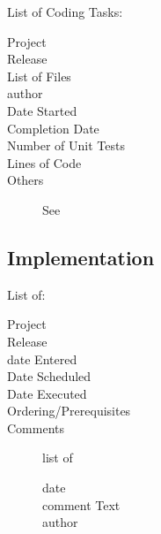 \documentclass[SDSUThesis.tex]{subfiles}
\begin{document}
    List of Coding Tasks:
    \begin{description}
      \item[Project] 
      \item[Release]
      \item[List of Files]
      \item[author]
      \item[Date Started]
      \item[Completion Date]
      \item[Number of Unit Tests]
      \item[Lines of Code]
      \item[Others] See \cite{Jones2009, Jones2012, Rubin2007, Snipes2013}
    \end{description}
    
    \subsection{Implementation}
    
    List of:
    \begin{description}
      \item[Project] 
      \item[Release]
      \item[date Entered]
      \item[Date Scheduled]
      \item[Date Executed]
      \item[Ordering/Prerequisites]
      \item[Comments] list of \\
      \begin{description}
        \item[date]
        \item[comment Text]
        \item[author]
      \end{description}
    \end{description}
\end{document}
